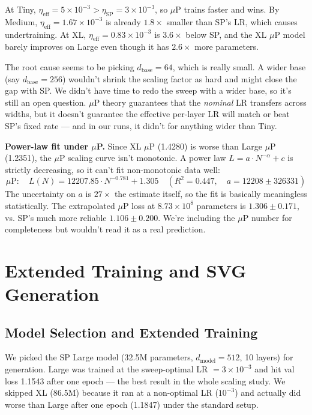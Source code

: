\documentclass[10pt,letterpaper]{article}
\begin{document}
At Tiny, $\eta_\text{eff} = 5 \times 10^{-3} > \eta_\text{SP} = 3 \times 10^{-3}$, so $\mu$P trains faster and wins. By Medium, $\eta_\text{eff} = 1.67 \times 10^{-3}$ is already $1.8\times$ smaller than SP's LR, which causes undertraining. At XL, $\eta_\text{eff} = 0.83 \times 10^{-3}$ is $3.6\times$ below SP, and the XL $\mu$P model barely improves on Large even though it has $2.6\times$ more parameters.

The root cause seems to be picking $d_\text{base} = 64$, which is really small. A wider base (say $d_\text{base} = 256$) wouldn't shrink the scaling factor as hard and might close the gap with SP. We didn't have time to redo the sweep with a wider base, so it's still an open question. $\mu$P theory guarantees that the \emph{nominal} LR transfers across widths, but it doesn't guarantee the effective per-layer LR will match or beat SP's fixed rate — and in our runs, it didn't for anything wider than Tiny.

\textbf{Power-law fit under $\mu$P.}
Since XL $\mu$P (1.4280) is worse than Large $\mu$P (1.2351), the $\mu$P scaling curve isn't monotonic. A power law $L = a \cdot N^{-\alpha} + c$ is strictly decreasing, so it can't fit non-monotonic data well:
\[
  \mu\text{P}: \quad L(N) = 12207.85 \cdot N^{-0.781} + 1.305
  \quad (R^2 = 0.447, \quad a = 12208 \pm 326331)
\]
The uncertainty on $a$ is $27\times$ the estimate itself, so the fit is basically meaningless statistically. The extrapolated $\mu$P loss at $8.73 \times 10^8$ parameters is $1.306 \pm 0.171$, vs. SP's much more reliable $1.106 \pm 0.200$. We're including the $\mu$P number for completeness but wouldn't read it as a real prediction.

\section{Extended Training and SVG Generation}
\label{sec:generation}

\subsection{Model Selection and Extended Training}
\label{sec:extended}

We picked the SP Large model (32.5M parameters, $d_\text{model} = 512$, 10 layers) for generation. Large was trained at the sweep-optimal LR $= 3 \times 10^{-3}$ and hit val loss 1.1543 after one epoch — the best result in the whole scaling study. We skipped XL (86.5M) because it ran at a non-optimal LR ($10^{-3}$) and actually did worse than Large after one epoch (1.1847) under the standard setup.
\end{document}
